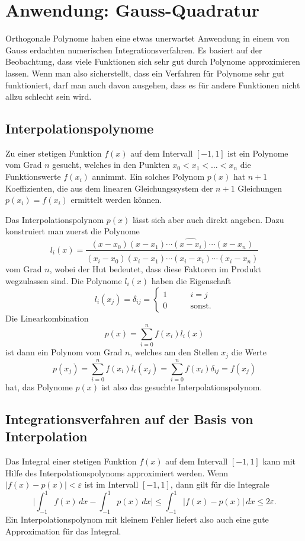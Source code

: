 %
%
\section{Anwendung: Gauss-Quadratur
\label{buch:orthogonal:section:gauss-quadratur}}
Orthogonale Polynome haben eine etwas unerwartet Anwendung in einem
von Gauss erdachten numerischen Integrationsverfahren.
Es basiert auf der Beobachtung, dass viele Funktionen sich sehr
gut durch Polynome approximieren lassen.
Wenn man also sicherstellt, dass ein Verfahren für Polynome
sehr gut funktioniert, darf man auch davon ausgehen, dass es für
andere Funktionen nicht allzu schlecht sein wird.

\subsection{Interpolationspolynome}
Zu einer stetigen Funktion $f(x)$ auf dem Intervall $[-1,1]$ 
ist ein Polynome vom Grad $n$ gesucht, welches in den Punkten
$x_0<x_1<\dots<x_n$ die Funktionswerte $f(x_i)$ annimmt.
Ein solches Polynom $p(x)$ hat $n+1$ Koeffizienten, die aus dem
linearen Gleichungssystem der $n+1$ Gleichungen $p(x_i)=f(x_i)$ 
ermittelt werden können.

Das Interpolationspolynom $p(x)$ lässt sich aber auch direkt 
angeben.
Dazu konstruiert man zuerst die Polynome
\[
l_i(x)
=
\frac{
(x-x_0)(x-x_1)\cdots\widehat{(x-x_i)}\cdots (x-x_n)
}{
(x_i-x_0)(x_i-x_1)\cdots\widehat{(x_i-x_i)}\cdots (x_i-x_n)
}
\]
vom Grad $n$, wobei der Hut bedeutet, dass diese Faktoren
im Produkt wegzulassen sind.
Die Polynome $l_i(x)$ haben die Eigenschaft
\[
l_i(x_j) = \delta_{ij}
=
\begin{cases}
1&\qquad i=j\\
0&\qquad\text{sonst}.
\end{cases}
\]
Die Linearkombination
\[
p(x) = \sum_{i=0}^n f(x_i)l_i(x)
\]
ist dann ein Polynom vom Grad $n$, welches am den Stellen $x_j$
die Werte
\[
p(x_j) 
=
\sum_{i=0}^n f(x_i)l_i(x_j)
=
\sum_{i=0}^n f(x_i)\delta_{ij}
=
f(x_j)
\]
hat, das Polynome $p(x)$ ist also das gesuchte Interpolationspolynom.

\subsection{Integrationsverfahren auf der Basis von Interpolation}
Das Integral einer stetigen Funktion $f(x)$ auf dem Intervall $[-1,1]$
kann mit Hilfe des Interpolationspolynoms approximiert werden.
Wenn $|f(x)-p(x)|<\varepsilon$ ist im Intervall $[-1,1]$, dann gilt
für die Integrale
\[
\biggl|\int_{-1}^1 f(x)\,dx -\int_{-1}^1p(x)\,dx\biggr|
\le
\int_{-1}^1 |f(x)-p(x)|\,dx
\le
2\varepsilon.
\]
Ein Interpolationspolynom mit kleinem Fehler liefert also auch
eine gute Approximation für das Integral.

